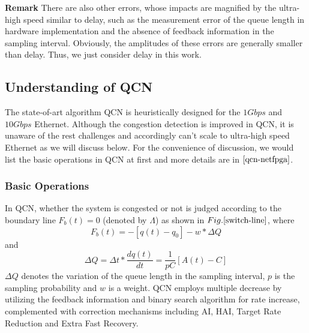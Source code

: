 \documentclass{sig-alternate-10pt}
\def\figurename{Fig.}
\begin{document}
\textbf{Remark} There are also other errors, whose impacts are magnified by the ultra-high speed similar to delay, such as the measurement error of the queue length in hardware implementation and the absence of feedback information in the sampling interval. Obviously, the amplitudes of these errors are generally smaller than delay. Thus, we just consider delay in this work.



\subsection{Understanding of QCN} The state-of-art algorithm QCN is heuristically designed for the $1Gbps$ and $10Gbps$ Ethernet. Although the congestion detection is improved in QCN, it is unaware of the rest challenges and accordingly can't scale to ultra-high speed Ethernet as we will discuss below. For the convenience of discussion, we would list the basic operations in QCN at first and more details are in $\cite{qcn-netfpga}$. 

\subsubsection{Basic Operations}
In QCN, whether the system is congested or not is judged according to the boundary line $F_b(t)=0$ (denoted by $\Lambda$) as shown in $\figurename{\ref{switch-line}}$, where 
\begin{equation}
F_b(t)=-[q(t)-q_0]-w*\Delta Q
\label{feedback}
\end{equation}
and 
\begin{equation}
\Delta Q= \Delta t* \frac{dq(t)}{dt}=\frac{1}{pC}[A(t)-C]
\label{deltaq}
\end{equation}
$\Delta Q$ denotes the variation of the queue length in the sampling interval, $p$ is the sampling probability and $w$ is a weight. QCN employs multiple decrease by utilizing the feedback information and binary search algorithm for rate increase, complemented with correction mechanisms including AI, HAI, Target Rate Reduction and Extra Fast Recovery.
\end{document}

